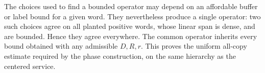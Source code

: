 The choices used to find a bounded operator may depend on an affordable
buffer or label bound for a given word. They nevertheless produce a
single operator: two such choices agree on all planted positive words,
whose linear span is dense, and are bounded. Hence they agree everywhere.
The common operator inherits every bound obtained with any admissible
$D,R,r$. This proves the uniform all-copy estimate required by the
phase construction, on the same hierarchy as the centered service.
